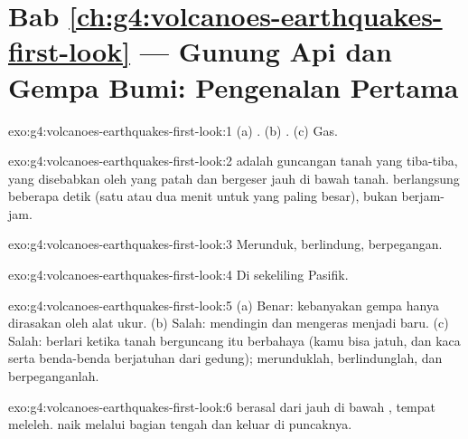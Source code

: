 \section*{Bab \ref{ch:g4:volcanoes-earthquakes-first-look} --- Gunung Api dan Gempa Bumi: Pengenalan Pertama}

\begin{solution}{exo:g4:volcanoes-earthquakes-first-look:1}
(a) . (b) . (c) Gas.
\end{solution}

\begin{solution}{exo:g4:volcanoes-earthquakes-first-look:2}
 adalah guncangan tanah yang tiba-tiba, yang disebabkan oleh
 yang patah dan bergeser jauh di bawah tanah.  berlangsung
beberapa detik (satu atau dua menit untuk yang paling besar), bukan
berjam-jam.
\end{solution}

\begin{solution}{exo:g4:volcanoes-earthquakes-first-look:3}
Merunduk, berlindung, berpegangan.
\end{solution}

\begin{solution}{exo:g4:volcanoes-earthquakes-first-look:4}
Di sekeliling  Pasifik.
\end{solution}

\begin{solution}{exo:g4:volcanoes-earthquakes-first-look:5}
(a) Benar: kebanyakan gempa hanya dirasakan oleh alat ukur. (b) Salah: 
mendingin dan mengeras menjadi  baru. (c) Salah: berlari ketika tanah
berguncang itu berbahaya (kamu bisa jatuh, dan kaca serta benda-benda
berjatuhan dari gedung); merunduklah, berlindunglah, dan berpeganganlah.
\end{solution}

\begin{solution}{exo:g4:volcanoes-earthquakes-first-look:6}
 berasal dari jauh di bawah , tempat  meleleh.  naik
melalui bagian tengah  dan keluar di puncaknya.
\end{solution}


